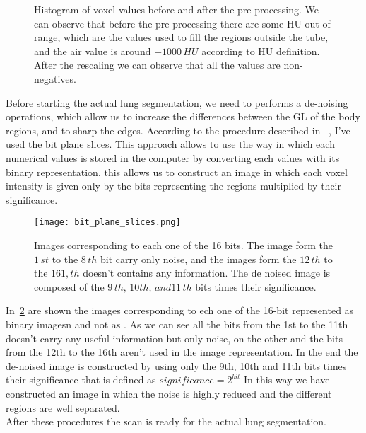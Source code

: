 \documentclass{standalone}
\begin{document}
	\begin{figure}[h]
		\centering
		\label{fig:Pre-Processing}\caption{Histogram of voxel values before and after the pre-processing. We can observe that before the pre processing there are some HU out of range, which are the values used to fill the regions outside the tube, and the air value is around $-1000\,HU$ according to HU definition. After the rescaling we can observe that all the values are non-negatives.}
	\end{figure}
	
	
	
	Before starting the actual lung segmentation, we need to performs a de-noising operations, which allow us to increase the differences between the GL of the body regions, and to sharp the edges. According to the procedure described in ~\cite{ART:Abdullah}, I've used the bit plane slices. This approach allows to use the way in which each numerical values is stored in the computer by converting  each values with its binary representation, this allows us to construct an image in which each voxel intensity is given only by the bits representing the regions multiplied by their significance.
	
	\begin{figure}[h]
		\centering
			\texttt{[image: bit\_plane\_slices.png]}
		\label{fig:BinaryRepr}\caption{Images corresponding to each one of the 16 bits. The image form the $1\,st$ to the $8\,th $ bit carry only noise, and the images form the $12\,th$ to the $161,th$ doesn't  contains any information. The de noised image is composed of the $9\,th,\,10th,\,and 11\,th$ bits times their significance. }
	\end{figure}

	In \figurename\,\ref{fig:BinaryRepr} are shown the images corresponding to ech one of the 16-bit represented as binary imagesn and not as . As we can see all the bits from the 1st to the 11th doesn't carry any useful information but only noise, on the other and the bits from the 12th to the 16th aren't used in the image representation. In the end the de-noised image is constructed by using only the 9th, 10th and 11th bits times their significance that is defined as $significance = 2^{bit}$
	In this way we have constructed an image in which the noise is highly reduced and the different regions are well separated.\\
	After these procedures the scan is ready for the actual lung segmentation.
	
\end{document}
